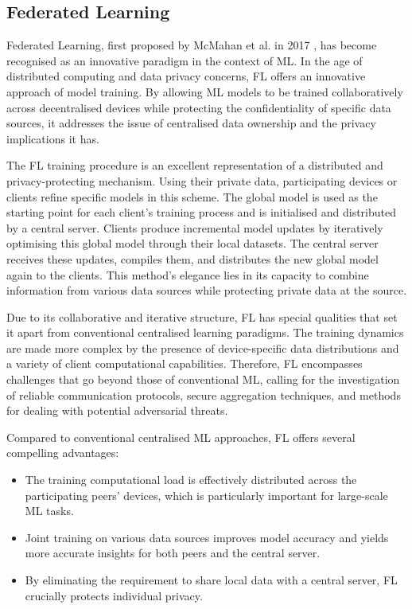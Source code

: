 \subsection{Federated Learning}
Federated Learning, first proposed by McMahan et al. in 2017 \cite{FederatedLearningPaper}, has become recognised as an innovative paradigm in the context of ML. In the age of distributed computing and data privacy concerns, FL offers an innovative approach of model training. By allowing ML models to be trained collaboratively across decentralised devices while protecting the confidentiality of specific data sources, it addresses the issue of centralised data ownership and the privacy implications it has.

The FL training procedure is an excellent representation of a distributed and privacy-protecting mechanism. Using their private data, participating devices or clients refine specific models in this scheme. The global model is used as the starting point for each client's training process and is initialised and distributed by a central server. Clients produce incremental model updates by iteratively optimising this global model through their local datasets. The central server receives these updates, compiles them, and distributes the new global model again to the clients. This method's elegance lies in its capacity to combine information from various data sources while protecting private data at the source.

Due to its collaborative and iterative structure, FL has special qualities that set it apart from conventional centralised learning paradigms. The training dynamics are made more complex by the presence of device-specific data distributions and a variety of client computational capabilities. Therefore, FL encompasses challenges that go beyond those of conventional ML, calling for the investigation of reliable communication protocols, secure aggregation techniques, and methods for dealing with potential adversarial threats.

Compared to conventional centralised ML approaches, FL offers several compelling advantages:

\begin{itemize}
        \item The training computational load is effectively distributed across the participating peers' devices, which is particularly important for large-scale ML tasks.
        \item Joint training on various data sources improves model accuracy and yields more accurate insights for both peers and the central server.
        \item  By eliminating the requirement to share local data with a central server, FL crucially protects individual privacy.
\end{itemize}

